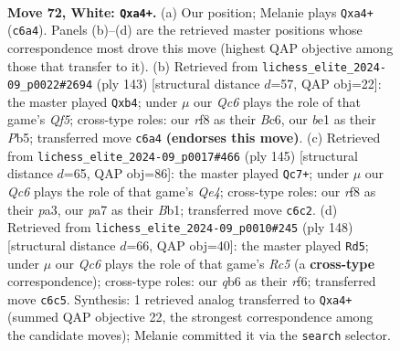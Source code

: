 \documentclass[11pt]{article}
\begin{document}
\clearpage

\begin{figure}[p]\centering
\begin{subfigure}{0.46\textwidth}\centering
\resizebox{\linewidth}{!}{%
\newchessgame
\chessboard[
  setfen={5r1r/p5p1/kqQ4p/3p3P/p2P2P1/4P3/7N/4b2K w - - 52 72},
  showmover=false,
  pgfstyle=straightmove, color=movearrow, markmove={c6-a4}
]}
\caption{}
\end{subfigure}\hfill
\begin{subfigure}{0.46\textwidth}\centering
\resizebox{\linewidth}{!}{%
\newchessgame
\chessboard[
  setfen={8/6pk/2b1p3/1pP1P1pP/1P3qP1/2R4K/8/2Q5 b - - 11 72},
  showmover=false,
  pgfstyle=straightmove, color=movearrow, markmove={f4-b4}
]}
\caption{}
\end{subfigure}
\\[4pt]
\begin{subfigure}{0.46\textwidth}\centering
\resizebox{\linewidth}{!}{%
\newchessgame
\chessboard[
  setfen={6k1/5pp1/7p/2KQq3/p7/P5P1/1P3R1P/1b6 b - - 16 73},
  showmover=false,
  pgfstyle=straightmove, color=movearrow, markmove={e5-c7}
]}
\caption{}
\end{subfigure}\hfill
\begin{subfigure}{0.46\textwidth}\centering
\resizebox{\linewidth}{!}{%
\newchessgame
\chessboard[
  setfen={8/8/p2q1rkp/2R2p2/3Q2pP/6P1/6PK/8 w - - 69 75},
  showmover=false,
  pgfstyle=straightmove, color=movearrow, markmove={c5-d5}
]}
\caption{}
\end{subfigure}
\caption{\textbf{Move 72, White: \texttt{Qxa4+}.} (a) Our position; Melanie plays \texttt{Qxa4+} (\texttt{c6a4}). Panels (b)--(d) are the retrieved master positions whose correspondence most drove this move (highest QAP objective among those that transfer to it). (b) Retrieved from \texttt{lichess\_elite\_2024-09\_p0022\#2694} (ply 143) [structural distance $d$=57, QAP obj=22]: the master played \texttt{Qxb4}; under $\mu$ our \emph{Qc6} plays the role of that game's \emph{Qf5}; cross-type roles: our \emph{r}f8 as their \emph{B}c6, our \emph{b}e1 as their \emph{P}b5; transferred move \texttt{c6a4} \textbf{(endorses this move)}. (c) Retrieved from \texttt{lichess\_elite\_2024-09\_p0017\#466} (ply 145) [structural distance $d$=65, QAP obj=86]: the master played \texttt{Qc7+}; under $\mu$ our \emph{Qc6} plays the role of that game's \emph{Qe4}; cross-type roles: our \emph{r}f8 as their \emph{p}a3, our \emph{p}a7 as their \emph{B}b1; transferred move \texttt{c6c2}. (d) Retrieved from \texttt{lichess\_elite\_2024-09\_p0010\#245} (ply 148) [structural distance $d$=66, QAP obj=40]: the master played \texttt{Rd5}; under $\mu$ our \emph{Qc6} plays the role of that game's \emph{Rc5} (a \textbf{cross-type} correspondence); cross-type roles: our \emph{q}b6 as their \emph{r}f6; transferred move \texttt{c6c5}. Synthesis: 1 retrieved analog transferred to \texttt{Qxa4+} (summed QAP objective 22, the strongest correspondence among the candidate moves); Melanie committed it via the \texttt{search} selector.}
\label{fig:thought-m142}
\end{figure}
\end{document}
